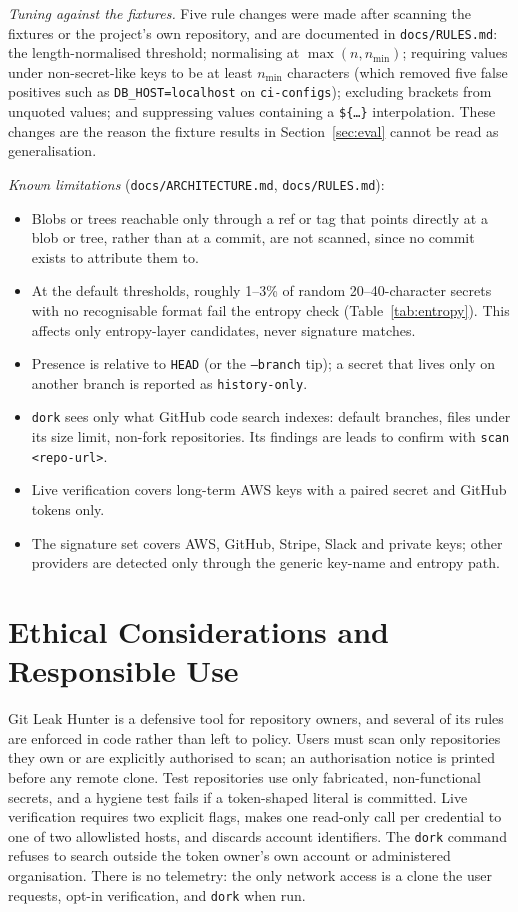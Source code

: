 \documentclass[conference]{IEEEtran}
\newcommand{\tool}{Git Leak Hunter}
\newcommand{\code}[1]{\texttt{#1}}
\begin{document}
\emph{Tuning against the fixtures.} Five rule changes were made after scanning the fixtures or the
project's own repository, and are documented in \code{docs/RULES.md}: the length-normalised
threshold; normalising at $\max(n,n_{\min})$; requiring values under non-secret-like keys to be at
least $n_{\min}$ characters (which removed five false positives such as \code{DB\_HOST=localhost}
on \code{ci-configs}); excluding brackets from unquoted values; and suppressing values containing
a \code{\$\{\ldots\}} interpolation. These changes are the reason the fixture results in
Section~\ref{sec:eval} cannot be read as generalisation.

\emph{Known limitations} (\code{docs/ARCHITECTURE.md}, \code{docs/RULES.md}):
\begin{itemize}
\item Blobs or trees reachable only through a ref or tag that points directly at a blob or tree,
  rather than at a commit, are not scanned, since no commit exists to attribute them to.
\item At the default thresholds, roughly 1--3\% of random 20--40-character secrets with no
  recognisable format fail the entropy check (Table~\ref{tab:entropy}). This affects only
  entropy-layer candidates, never signature matches.
\item Presence is relative to \code{HEAD} (or the \code{--branch} tip); a secret that lives only on
  another branch is reported as \code{history-only}.
\item \code{dork} sees only what GitHub code search indexes: default branches, files under its size
  limit, non-fork repositories. Its findings are leads to confirm with \code{scan <repo-url>}.
\item Live verification covers long-term AWS keys with a paired secret and GitHub tokens only.
\item The signature set covers AWS, GitHub, Stripe, Slack and private keys; other providers are
  detected only through the generic key-name and entropy path.
\end{itemize}

\section{Ethical Considerations and Responsible Use}\label{sec:ethics}

\tool{} is a defensive tool for repository owners, and several of its rules are enforced in code
rather than left to policy. Users must scan only repositories they own or are explicitly
authorised to scan; an authorisation notice is printed before any remote clone. Test repositories
use only fabricated, non-functional secrets, and a hygiene test fails if a token-shaped literal is
committed. Live verification requires two explicit flags, makes one read-only call per credential
to one of two allowlisted hosts, and discards account identifiers. The \code{dork} command refuses
to search outside the token owner's own account or administered organisation. There is no
telemetry: the only network access is a clone the user requests, opt-in verification, and
\code{dork} when run.
\end{document}
